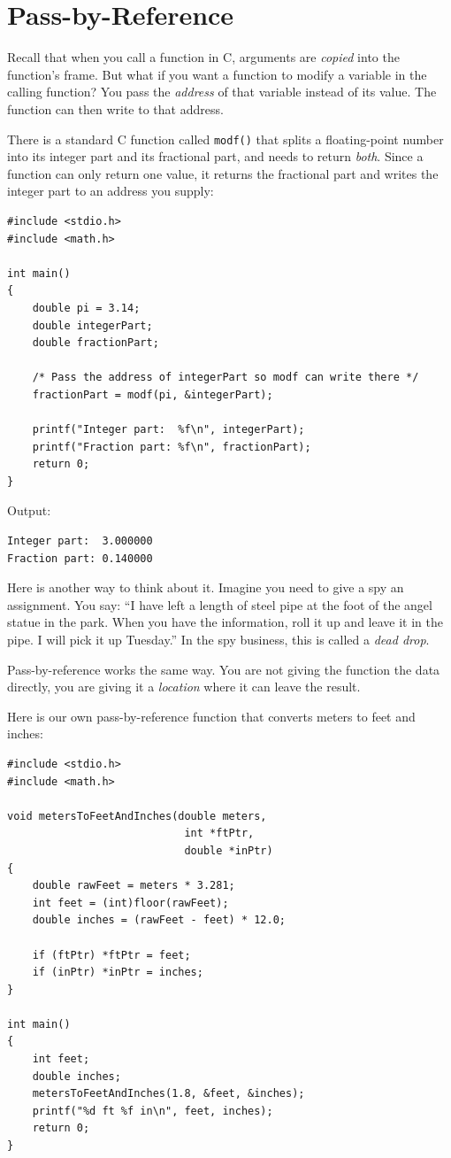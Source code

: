 \section{Pass-by-Reference}

Recall that when you call a function in C, arguments are \emph{copied}
into the function's frame.  But what if you want a function to modify a
variable in the calling function?  You pass the \emph{address} of that
variable instead of its value.  The function can then write to that
address.

There is a standard C function called \texttt{modf()} that
splits a floating-point number into its integer part and its fractional
part, and needs to return \emph{both}.  Since a function can only return
one value, it returns the fractional part and writes the integer part to
an address you supply:

\begin{verbatim}
#include <stdio.h>
#include <math.h>

int main()
{
    double pi = 3.14;
    double integerPart;
    double fractionPart;

    /* Pass the address of integerPart so modf can write there */
    fractionPart = modf(pi, &integerPart);

    printf("Integer part:  %f\n", integerPart);
    printf("Fraction part: %f\n", fractionPart);
    return 0;
}
\end{verbatim}

Output:
\begin{verbatim}
Integer part:  3.000000
Fraction part: 0.140000
\end{verbatim}

Here is another way to think about it.  Imagine you need to give a spy
an assignment.  You say: ``I have left a length of steel pipe at the foot
of the angel statue in the park.  When you have the information, roll
it up and leave it in the pipe.  I will pick it up Tuesday.''  In the spy
business, this is called a \emph{dead drop}.

Pass-by-reference works the same way.  You are not giving the function
the data directly, you are giving it a \emph{location} where it can
leave the result.

Here is our own pass-by-reference function that converts meters to feet
and inches:

\begin{verbatim}
#include <stdio.h>
#include <math.h>

void metersToFeetAndInches(double meters,
                            int *ftPtr,
                            double *inPtr)
{
    double rawFeet = meters * 3.281;
    int feet = (int)floor(rawFeet);
    double inches = (rawFeet - feet) * 12.0;

    if (ftPtr) *ftPtr = feet;
    if (inPtr) *inPtr = inches;
}

int main()
{
    int feet;
    double inches;
    metersToFeetAndInches(1.8, &feet, &inches);
    printf("%d ft %f in\n", feet, inches);
    return 0;
}
\end{verbatim}

